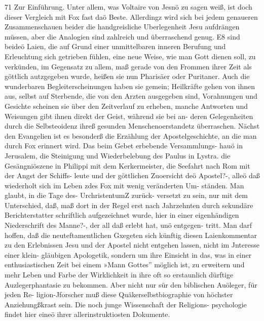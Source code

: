 71 Zur Einführung.
Unter allem, was Voltaire von Jesnö zu sagen weiß, ist doch
dieser Vergleich mit Fox fast daö Beste. Allerdingz wird sich bei
jedem genaueren Zusammenschauen beider die handgreisliche
Uberlegenheit Jesu aufdrängen müssen, aber die Analogien sind
zahlreich und überraschend genug. E8 sind beideö Laien, die auf
Grund einer unmittelbaren inneren Berufung und Erleuchtung
sich getrieben fühlen, eine neue Weise, wie man Gott dienen soll,
zu verkünden, im Gegensatz zu allem, maß gerade von den Frommen
ihrer Zeit als göttlich autzgegeben wurde, heißen sie nun Pharisäer
oder Puritaner. Auch die wunderbaren Begleiterscheinungen haben
sie gemein; Heilkräfte gehen von ihnen aus, selbst auf Sterbende,
die von den Arzten ausgegeben sind, Vorahnungen und Gesichte
scheinen sie über den Zeitverlauf zu erheben, manche Antworten
und Weisungen gibt ihnen direkt der Geist, während sie bei an-
deren Gelegenheiten durch die Selbsteoidenz ihreß gesunden
Menschenoerstandetz überraschen. Nächst den Evangelien ist es
besonderß die Erzählung der Apostelgeschichte, an die man durch
Fox erinnert wird. Das beim Gebet erbebende Versammlungs-
hauö in Jerusalem, die Steinigung und Wiederbelebung des
Paulus in Lystra. die Gesängniöszene in Philippi mit dem
Kerkermeister, die Seefahrt nach Rom mit der Angst der Schiffs-
leute und der göttlichen Zuoersicht deö Apostel?-, alleö daß
wiederholt sich im Leben zdes Fox mit wenig veränderten Um-
ständen. Man glaubt, in die Tage des- UrchristentumZ zurück-
versetzt zu sein, nur mit dem Unterschied, daß, maß dort in der
Regel erst nach Jahrzehnten durch sekundäre Berichterstatter
schriftlich aufgezeichnet wurde, hier in einer eigenhändigen
Niederschrift des Manne?-, der all daß erlebt hat, unö entgegen-
tritt. Man darf hoffen, daß die neuteftamentlichen Gxegeten sich
künftig diesen Laienkommentar zu den Erlebnissen Jesu und der
Apostel nicht entgehen lassen, nicht im Jnteresse einer klein-
gläubigen Apologetik, sondern um ihre Einsicht in das, was in
einer enthusiastischen Zeit bei einem »Mann Gottes'' möglich ist,
zu erweitern und mehr Leben und Farbe der Wirklichkeit in ihre
oft so erstaunlich dürftige Auzlegerphantasie zu bekommen.
Aber nicht nur sür den biblischen Auöleger, für jeden Re-
ligion-Jforscher muß diese Quäkerselbstbiographie von höchster
Anziehungßkrast sein. Die noch junge Wissenschaft der Religions-
psychologie findet hier eineö ihrer allerinstruktiosten Dokumente.


